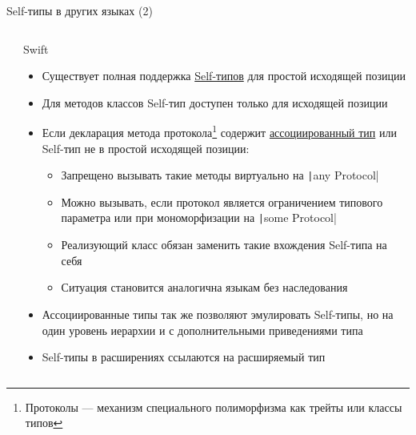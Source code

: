 \documentclass[handout,aspectratio=169,usenames,dvipsnames]{beamer}
\begin{document}
\begin{frame}[fragile]{Self-типы в других языках (2)}
    \begin{columns}[onlytextwidth]
        \begin{column}{0.0\textwidth}

        \end{column}\hfill%
        \pause
        \begin{column}{0.99\textwidth}
            \begin{block}{Swift}
                \begin{itemize}
                    \item Существует полная поддержка \href{https://docs.swift.org/swift-book/documentation/the-swift-programming-language/types/\#Self-Type}{\color{blue}Self-типов} для простой исходящей позиции \pause
                    \item Для методов классов Self-тип доступен только для исходящей позиции \pause
                    \item Если декларация метода протокола\footnote{Протоколы --- механизм специального полиморфизма как трейты или классы типов} содержит \href{https://docs.swift.org/swift-book/documentation/the-swift-programming-language/generics/\#Associated-Types}{\color{blue}ассоциированный тип} или Self-тип не в простой исходящей позиции: \pause
                    \begin{itemize}
                        \item Запрещено вызывать такие методы виртуально на \texttt|any Protocol|
                        \item Можно вызывать, если протокол является ограничением типового параметра или при мономорфизации на \texttt|some Protocol|
                        \item Реализующий класс обязан заменить такие вхождения Self-типа на себя
                        \item Ситуация становится аналогична языкам без наследования
                    \end{itemize} \pause
                    \item Ассоциированные типы так же позволяют эмулировать Self-типы, но на один уровень иерархии и с дополнительными приведениями типа \pause
                    \item Self-типы в расширениях ссылаются на расширяемый тип
                \end{itemize}
            \end{block}
        \end{column}
    \end{columns}
\end{frame}
\end{document}
